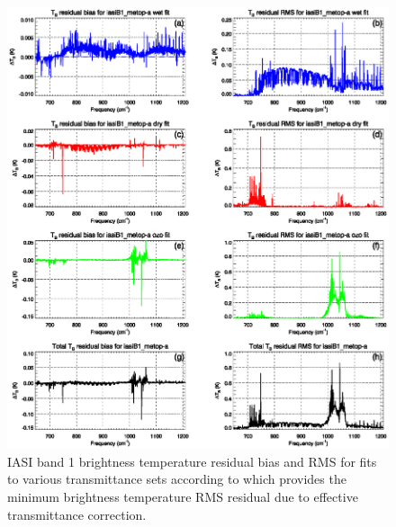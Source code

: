 \begin{figure}[htp]
  \centering
  \includegraphics[scale=0.8]{graphics/stats/new/iasiB1_metop-a.FitStats.eps}
  \caption{IASI band 1 brightness temperature residual bias and RMS for fits to various transmittance sets according to which provides the minimum brightness temperature RMS residual due to effective transmittance correction.}
  \label{fig:new_iasiB1_stats}
\end{figure}


